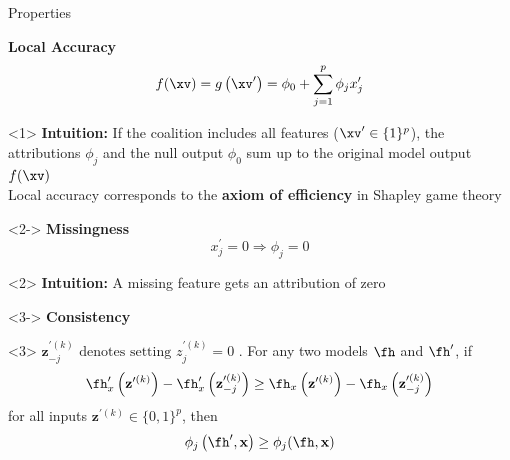 \documentclass[11pt,compress,t,notes=noshow, aspectratio=169, xcolor=table]{beamer}
\begin{document}







\begin{frame}{Properties}

\textbf{Local Accuracy}
$$
f(\xv)=g\left(\xv^{\prime}\right)=\phi_{0}+\sum_{j=1}^{p} \phi_{j} x_{j}^{\prime}
$$
\begin{onlyenv}<1>
\textbf{Intuition:} If the coalition includes all features ($\xv^{\prime}  \in \{1\}^p $), the attributions $\phi_j$ and the null output $\phi_0$ sum up to the original model output $f(\xv)$\\\medskip
Local accuracy corresponds to the \textbf{axiom of efficiency} in Shapley game theory 

\end{onlyenv}

\begin{onlyenv}<2->
\textbf{Missingness}
$$
x_{j}^{\prime}=0 \Longrightarrow \phi_{j}=0
$$
\end{onlyenv}

\begin{onlyenv}<2>
\textbf{Intuition:}  A missing feature gets an attribution of zero
\end{onlyenv}

\begin{onlyenv}<3->
\textbf{Consistency} \\
\end{onlyenv}
\begin{onlyenv}<3>
$\mathbf{z}^{\prime (k)}_{-j} \text{ denotes setting } z_{j}^{\prime (k)}=0$ . For any two
models $\fh$ and $\fh^{\prime}$, if
$$
\fh_{x}^{\prime}\left(\mathbf{z}^{\prime (k)}\right)-\fh_{x}^{\prime}\left(\mathbf{z}^{\prime (k)}_{-j}\right) \geq \fh_{x}\left(\mathbf{z}^{\prime (k)}\right)-\fh_{x}\left(\mathbf{z}^{\prime (k)}_{-j}\right)
$$
for all inputs $\mathbf{z}^{\prime (k)} \in \{0, 1\}^p$, then
$$
\phi_{j}\left(\fh^{\prime}, \mathbf{x}\right) \geq \phi_{j}(\fh, \mathbf{x})
$$
\end{onlyenv}


\end{frame}
\end{document}
